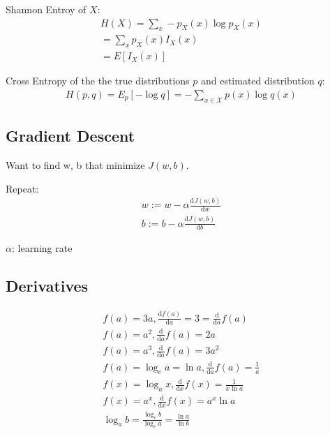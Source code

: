 Shannon Entroy of $X$:
\begin{align}
	H(X) = \sum_{x} -p_X(x)\log{p_X(x)} \\
	= \sum_{x} p_X(x)I_X(x) \\
	= E[I_X(x)]
\end{align}

Cross Entropy of the the true distributions $p$ and estimated distribution $q$:
\begin{align}
	H(p, q) = E_p[-\log{q}] = -\sum_{x \in \mathcal X} p(x) \log{q(x)}
\end{align}


\subsection{Gradient Descent}
Want to find w, b that minimize $J(w, b)$.

Repeat:
\begin{align}
	w := w - \alpha \frac{\mathrm{d} J(w,b)}{\mathrm{d} w} \\
	b := b - \alpha \frac{\mathrm{d} J(w,b)}{\mathrm{d} b}
\end{align}

$\alpha$: learning rate


\subsection{Derivatives}
\begin{align}
	f(a) = 3a, \frac{\mathrm{d} f(a)}{\mathrm{d} a} = 3 = \frac{\mathrm{d}}{\mathrm{d} a} f(a) \\
	f(a) = a^2, \frac{\mathrm{d}}{\mathrm{d} a} f(a) = 2a \\
	f(a) = a^3, \frac{\mathrm{d}}{\mathrm{d} a} f(a) = 3a^2 \\
	f(a) = \log_e{a} = \ln{a}, \frac{\mathrm{d}}{\mathrm{d} a} f(a) = \frac{1}{a} \\
	f(x) = \log_a{x}, \frac{\mathrm{d}}{\mathrm{d} x} f(x) = \frac{1}{x\ln{a}} \\
	f(x) = a^x, \frac{\mathrm{d}}{\mathrm{d} x} f(x) = a^x \ln{a} \\
	\log_a{b} = \frac{\log_c{b}}{\log_c{a}} = \frac{\ln{a}}{\ln{b}}
\end{align}